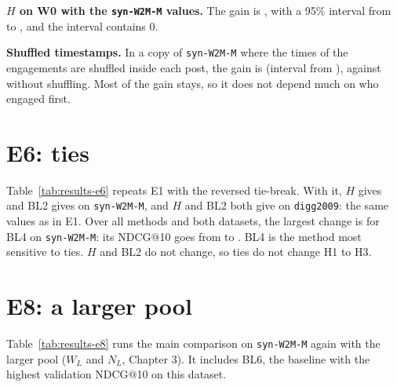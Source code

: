 \textbf{$H$ on W0 with the \texttt{syn-W2M-M} values.} The gain is \eFiveWZeroTopicNdcgTenAllGain{}, with a 95\% interval from \eFiveWZeroTopicNdcgTenAllCiLow{} to \eFiveWZeroTopicNdcgTenAllCiHigh{}, and the interval contains 0.

\textbf{Shuffled timestamps.} In a copy of \texttt{syn-W2M-M} where the times of the engagements are shuffled inside each post, the gain is \eFiveWTwoMShuffledNdcgTenAllGain{} (interval from \eFiveWTwoMShuffledNdcgTenAllCiLow{}), against \eFiveWTwoMNdcgTenAllGain{} without shuffling. Most of the gain stays, so it does not depend much on who engaged first.

\section{E6: ties}
\label{sec:results-e6}

Table~\ref{tab:results-e6} repeats E1 with the reversed tie-break. With it, $H$ gives \eSixWTwoMNdcgHTenAllValue{} and BL2 gives \eSixWTwoMNdcgBLTwoTenAllValue{} on \texttt{syn-W2M-M}, and $H$ and BL2 both give \eSixDiggNdcgHTenAllValue{} on \texttt{digg2009}: the same values as in E1. Over all methods and both datasets, the largest change is for BL4 on \texttt{syn-W2M-M}: its NDCG@10 goes from \eOneWTwoMNdcgBLFourTenAllValueFull{} to \eSixWTwoMNdcgBLFourTenAllValueFull{}. BL4 is the method most sensitive to ties. $H$ and BL2 do not change, so ties do not change H1 to H3.

\begin{table}[htbp]
  \centering
  \caption{E6: NDCG@10, all users, with the normal and the reversed tie-break.}
  \label{tab:results-e6}
  \small
  \resizebox{\textwidth}{!}{}
\end{table}

\section{E8: a larger pool}
\label{sec:results-e8}

Table~\ref{tab:results-e8} runs the main comparison on \texttt{syn-W2M-M} again with the larger pool ($W_L$ and $N_L$, Chapter 3). It includes BL6, the baseline with the highest validation NDCG@10 on this dataset.

\begin{table}[htbp]
  \centering
  \caption{E8: NDCG@10 on \texttt{syn-W2M-M} with the normal and the larger pool.}
  \label{tab:results-e8}
  \small
  
\end{table}

